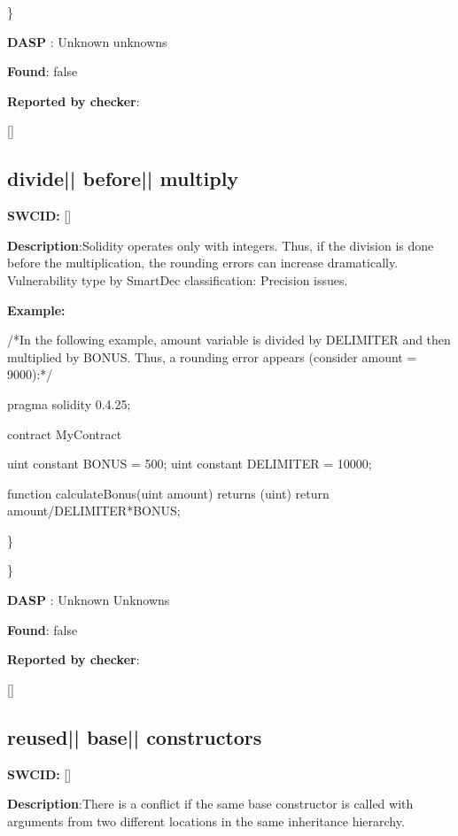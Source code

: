 \documentclass{article}
\begin{document}
\} 

\textbf{DASP} : Unknown unknowns

\textbf{Found}: false

\textbf{Reported by checker}: 
\begin{ffcode} 

[]
\end{ffcode} 
\subsection{divide{|\textunderscore| }before{|\textunderscore| }multiply} 
\textbf{SWC{\textunderscore }ID:} []

\textbf{Description}:Solidity operates only with integers. Thus, if the division is done before the multiplication, the rounding errors can increase dramatically. Vulnerability type by SmartDec classification: Precision issues.


\textbf{Example:} 
\begin{ffcode} 

/*In the following example, amount variable is divided by DELIMITER and then multiplied by BONUS. Thus, a rounding error appears (consider amount = 9000):*/ 

pragma solidity 0.4.25;

contract MyContract {

    uint constant BONUS = 500;
    uint constant DELIMITER = 10000;

    function calculateBonus(uint amount) returns (uint) {
        return amount/DELIMITER*BONUS;
    }
}

\end{ffcode} 
\} 

\} 

\textbf{DASP} : Unknown Unknowns

\textbf{Found}: false

\textbf{Reported by checker}: 
\begin{ffcode} 

[]
\end{ffcode} 
\subsection{reused{|\textunderscore| }base{|\textunderscore| }constructors} 
\textbf{SWC{\textunderscore }ID:} []

\textbf{Description}:There is a conflict if the same base constructor is called with arguments from two different locations in the same inheritance hierarchy.
\end{document}
